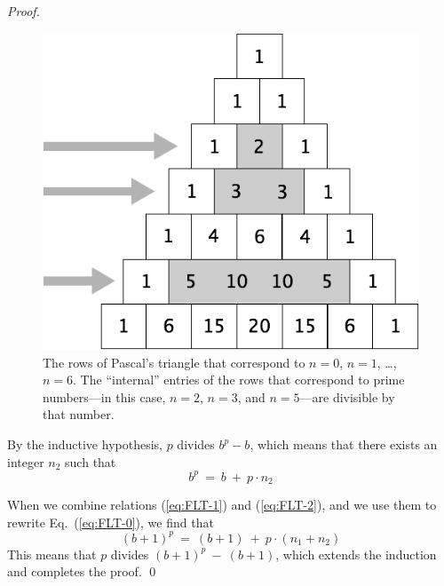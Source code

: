 \begin{proof}
\begin{figure}[ht]
\begin{center}
  \includegraphics[scale=0.3]{FiguresArithmetic/TrianglePascalPrimes.png}
\caption{The rows of Pascal's triangle that correspond to $n=0$, $n=1$, \ldots, $n=6$.  The ``internal'' entries of the rows that correspond to prime numbers---in this case, $n=2$, $n=3$, and $n=5$---are divisible by that number.}
\label{fig:TrianglePrime}
\end{center}
\end{figure}

By the inductive hypothesis, $p$ divides $b^p -b$, which means that there exists an integer $n_2$ such that
\begin{equation}
\label{eq:FLT-2}
 b^p \ = \ b \ + \ p \cdot n_2
\end{equation}

\smallskip

When we combine relations (\ref{eq:FLT-1}) and (\ref{eq:FLT-2}), and we use them to rewrite Eq.~(\ref{eq:FLT-0}), we find that
\[
(b+1)^p \ = \ (b + 1) \ + \ p \cdot (n_1 + n_2)
\]
This means that $p$ divides $(b+1)^p \ - \ (b + 1)$, which extends the induction and completes the proof.  \qed
\end{proof}

